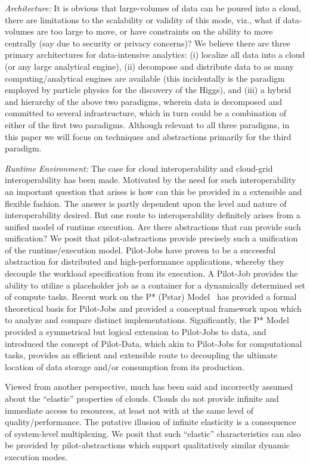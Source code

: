 \documentclass[times]{cpeauth}
\newcommand{\pilotjob}{Pilot-Job\xspace}
\newcommand{\pilotjobs}{Pilot-Jobs\xspace}
\begin{document}
{\it Architecture:} It is obvious that large-volumes of data can be
poured into a cloud, there are limitations to the scalability or
validity of this mode, viz., what if data-volumes are too large to
move, or have constraints on the ability to move centrally (say due to
security or privacy concerns)?  We believe there are three primary
architectures for data-intensive analytics: (i) localize all data into
a cloud (or any large analytical engine), (ii) decompose and
distribute data to as many computing/analytical engines are available
(this incidentally is the paradigm employed by particle physics for
the discovery of the Higgs), and (iii) a hybrid and hierarchy of the
above two paradigms, wherein data is decomposed and committed to
several infrastructure, which in turn could be a combination of either
of the first two paradigms.  Although relevant to all three paradigms,
in this paper we will focus on techniques and abstractions primarily
for the third paradigm.

{\it Runtime Environment:} The case for cloud interoperability and
cloud-grid interoperability has been made. Motivated by the need for
such interoperability an important question that arises is how can
this be provided in a extensible and flexible fashion. The answer is
partly dependent upon the level and nature of interoperability
desired. But one route to interoperability definitely arises from a
unified model of runtime execution. Are there abstractions that can
provide such unification? We posit that pilot-abstractions provide
precisely such a unification of the runtime/execution model.
\pilotjobs have proven to be a successful abstraction for distributed
and high-performance applications, whereby they decouple the workload
specification from its execution. A \pilotjob provides the ability to
utilize a placeholder job as a container for a dynamically determined
set of compute tasks. Recent work on the P* (Pstar)
Model~\cite{pstar12} has provided a formal theoretical basis for
Pilot-Jobs and provided a conceptual framework upon which to analyze
and compare distinct implementations. Significantly, the P* Model
provided a symmetrical but logical extension to Pilot-Jobs to data,
and introduced the concept of Pilot-Data, which akin to Pilot-Jobs for
computational tasks, provides an efficient and extensible route to
decoupling the ultimate location of data storage and/or consumption
from its production.

Viewed from another perspective, much has been said and incorrectly
assumed about the ``elastic'' properties of clouds. Clouds do not
provide infinite and immediate access to resources, at least not with
at the same level of quality/performance. The putative illusion of
infinite elasticity is a consequence of system-level multiplexing.  We
posit that such ``elastic'' characteristics can also be provided by
pilot-abstractions which support qualitatively similar dynamic
execution modes.
\end{document}
